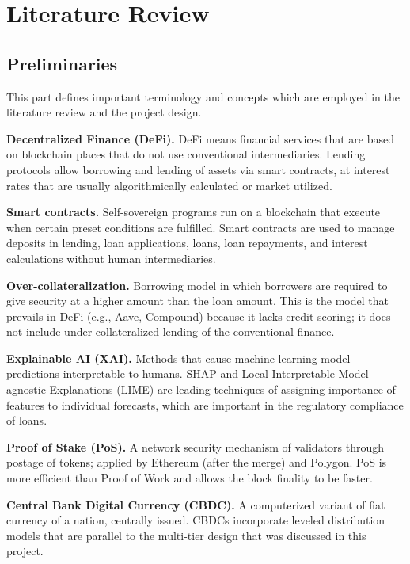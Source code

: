 \documentclass[12pt,a4paper]{report}
\begin{document}
\chapter{Literature Review}

\section{Preliminaries}

This part defines important terminology and concepts which are employed in the literature review and the project design.

\hangindent=0.5in \textbf{Decentralized Finance (DeFi).} DeFi means financial services that are based on blockchain places that do not use conventional intermediaries. Lending protocols allow borrowing and lending of assets via smart contracts, at interest rates that are usually algorithmically calculated or market utilized.

\hangindent=0.5in \textbf{Smart contracts.} Self-sovereign programs run on a blockchain that execute when certain preset conditions are fulfilled. Smart contracts are used to manage deposits in lending, loan applications, loans, loan repayments, and interest calculations without human intermediaries.

\hangindent=0.5in \textbf{Over-collateralization.} Borrowing model in which borrowers are required to give security at a higher amount than the loan amount. This is the model that prevails in DeFi (e.g., Aave, Compound) because it lacks credit scoring; it does not include under-collateralized lending of the conventional finance.

\hangindent=0.5in \textbf{Explainable AI (XAI).} Methods that cause machine learning model predictions interpretable to humans. SHAP and Local Interpretable Model-agnostic Explanations (LIME) are leading techniques of assigning importance of features to individual forecasts, which are important in the regulatory compliance of loans.

\hangindent=0.5in \textbf{Proof of Stake (PoS).} A network security mechanism of validators through postage of tokens; applied by Ethereum (after the merge) and Polygon. PoS is more efficient than Proof of Work and allows the block finality to be faster.

\hangindent=0.5in \textbf{Central Bank Digital Currency (CBDC).} A computerized variant of fiat currency of a nation, centrally issued. CBDCs incorporate leveled distribution models that are parallel to the multi-tier design that was discussed in this project.
\end{document}
